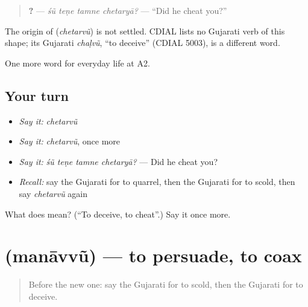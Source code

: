 \begin{quote}
\textbf{   ?} — \emph{śũ teṇe tamne chetaryā?} — \textquotedblleft{}Did he cheat you?\textquotedblright{}
\end{quote}

\begin{cousinweb}
The origin of \textbf{} (\emph{chetarvũ}) is not settled. CDIAL lists no Gujarati verb of this shape; its Gujarati \emph{chaḷvũ}, \textquotedblleft{}to deceive\textquotedblright{} (CDIAL 5003), is a different word.
\end{cousinweb}

\begin{grammarlens}[title={What you've built}]
One more word for everyday life at A2.
\end{grammarlens}

\subsection*{Your turn}
\begin{itemize}
\raggedright
  \item \emph{Say it:} \emph{chetarvũ}
  \item \emph{Say it:} \emph{chetarvũ}, once more
  \item \emph{Say it:} \emph{śũ teṇe tamne chetaryā?} — Did he cheat you?
  \item \emph{Recall:} say the Gujarati for to quarrel, then the Gujarati for to scold, then say \emph{chetarvũ} again
\end{itemize}

\begin{tcolorbox}[breakable,colback=teal!4,colframe=teal!35!black,title={Before you move on}]
What does  mean? (\textquotedblleft{}To deceive, to cheat\textquotedblright{}.) Say it once more.
\end{tcolorbox}
\section[\texorpdfstring{\gu{મનાવવું} (manāvvũ)}{મનાવવું (manāvvũ)}]{ (manāvvũ) — to persuade, to coax}

\label{lesson:GU-C268-manavvu}



\begin{quote}
Before the new one: say the Gujarati for to scold, then the Gujarati for to deceive.
\end{quote}

